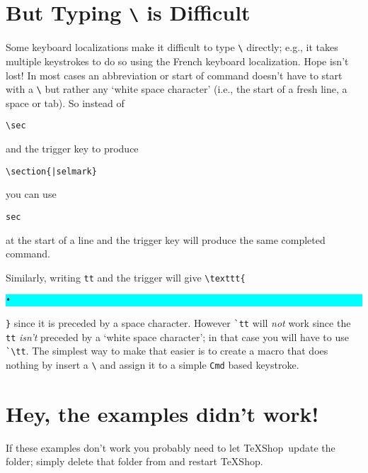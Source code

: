 \documentclass[11pt]{article}
\newcommand{\mnu}[1]{\texttt{#1}}
\newcommand{\cmd}[1]{\texttt{#1}}
\newcommand{\selmark}{\colorbox{cyan}{\rule[-0.5ex]{0ex}{2.1ex}\texttt{•}}}
\newcommand{\TS}{\textsf{\TeX Shop}}
\begin{document}
\section*{But Typing \cmd{\textbackslash} is Difficult}

Some keyboard localizations make it difficult to type \verb|\| directly; e.g., it takes multiple keystrokes to do so using the French keyboard localization. Hope isn't lost! In most cases an abbreviation or start of command doesn't have to start with a \verb|\| but rather any `white space character' (i.e., the start of a fresh line, a space or tab). So instead of 
\begin{verbatim}
\sec
\end{verbatim}
and the trigger key to produce
\begin{verbatim}
\section{|selmark}
\end{verbatim}
you can use
\begin{verbatim}
sec
\end{verbatim}
at the start of a line and the trigger key will produce the same completed command.

Similarly, writing \verb|tt| and the trigger will give \verb|\texttt{|\selmark\verb|}| since it is preceded by a space character. However \verb|`tt| will \emph{not} work since the \verb|tt| \emph{isn't} preceded by a `white space character'; in that case you will have to use \verb|`\tt|. The simplest way to make that easier is to create a macro that does nothing by insert a \verb|\| and assign it to a simple \mnu{Cmd} based keystroke.

\section*{Hey, the examples didn't work!}

%

If these examples don't work you probably need to let \TS\ update the  folder; simply delete that folder from  and restart \TS.
\end{document}
